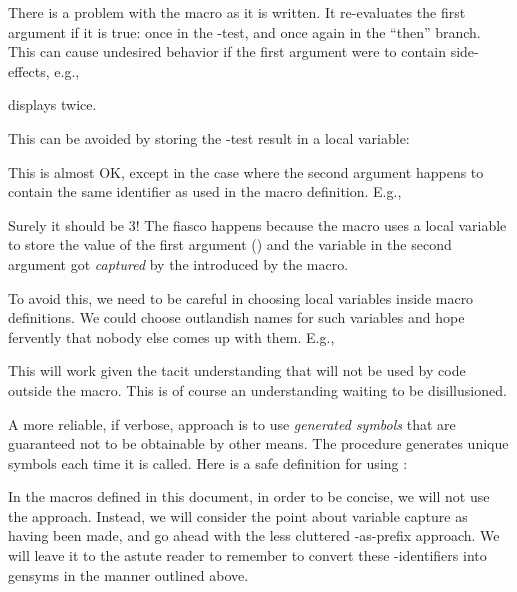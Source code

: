 There is a problem with the  macro as it is
written.  It re-evaluates the first argument if it is
true: once in the -test, and once again in the
“then” branch.  This can cause undesired behavior if
the first argument were to contain side-effects, e.g.,


\n displays  twice.

This can be avoided by storing
the -test result in a local variable:


\n This is almost OK, except in the case where the
  second argument happens to contain the same
  identifier  as used in the macro definition.
  E.g.,


\n Surely it should be 3!  The fiasco happens because
the macro uses a local variable  to store the
value of the first argument () and the 
variable 
 in the second argument got {\em captured} by
the
 introduced by the macro.

To avoid this, we need to be careful in choosing local
variables inside macro definitions.  We could choose
outlandish names for such variables and hope fervently
that nobody else comes up with them.   E.g.,


\n This will work given the tacit understanding 
that  will not be used by code outside the
macro.  This is of course an understanding waiting to
be disillusioned.


A more reliable, if verbose, approach is to use {\em
generated symbols} that are guaranteed not to be
obtainable by other means.  The procedure 
generates unique symbols each time it is called.  Here
is a safe definition for  using :


\n In the macros defined in this document, in order to be
concise, we will not use the  approach.
Instead, we will consider the point about variable
capture as having been made, and go ahead with the less
cluttered \q{+}-as-prefix approach.  We will leave it
to the astute reader to remember to convert these
\q{+}-identifiers into gensyms in the manner outlined
above.

